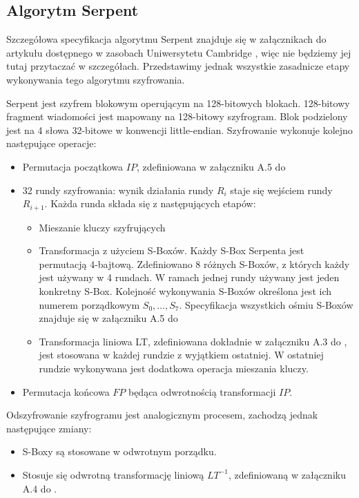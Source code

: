 \documentclass{article}
\begin{document}
	\subsection{Algorytm Serpent}
	Szczegółowa specyfikacja algorytmu Serpent znajduje się w załącznikach do artykułu dostępnego w zasobach Uniwersytetu Cambridge \cite{Anderson}, więc nie będziemy jej tutaj przytaczać w szczegółach. Przedstawimy jednak wszystkie zasadnicze etapy wykonywania tego algorytmu szyfrowania. 
	
	Serpent jest szyfrem blokowym operującym na 128-bitowych blokach. 128-bitowy fragment wiadomości jest mapowany na 128-bitowy szyfrogram. Blok podzielony jest na 4 słowa 32-bitowe w konwencji little-endian. Szyfrowanie wykonuje kolejno następujące operacje:
	\begin{itemize}
		\item Permutacja początkowa $IP$, zdefiniowana w załączniku A.5 do \cite{Anderson}
		\item 32 rundy szyfrowania: wynik działania rundy $R_i$ staje się wejściem rundy $R_{i+1}$. Każda runda składa się z następujących etapów:
		\begin{itemize}
			\item Mieszanie kluczy szyfrujących
			\item Transformacja z użyciem S-Boxów. Każdy S-Box Serpenta jest permutacją 4-bajtową. Zdefiniowano 8 różnych S-Boxów, z których każdy jest używany w 4 rundach. W ramach jednej rundy używany jest jeden konkretny S-Box. Kolejność wykonywania S-Boxów określona jest ich numerem porządkowym $S_0, \ldots, S_7$. 
			Specyfikacja wszystkich ośmiu S-Boxów znajduje się w załączniku A.5 do \cite{Anderson}
			\item Transformacja liniowa LT, zdefiniowana dokładnie w załączniku A.3 do \cite{Anderson}, jest stosowana w każdej rundzie z wyjątkiem ostatniej. W ostatniej rundzie wykonywana jest dodatkowa operacja mieszania kluczy. 
		\end{itemize}
		\item Permutacja końcowa $FP$ będąca odwrotnością transformacji $IP$. 
	\end{itemize}

	Odszyfrowanie szyfrogramu jest analogicznym procesem, zachodzą jednak następujące zmiany:
	\begin{itemize}
		\item S-Boxy są stosowane w odwrotnym porządku. 
		\item Stosuje się odwrotną transformację liniową $LT^{-1}$, zdefiniowaną w załączniku A.4 do \cite{Anderson}. 
	\end{itemize}
\end{document}
